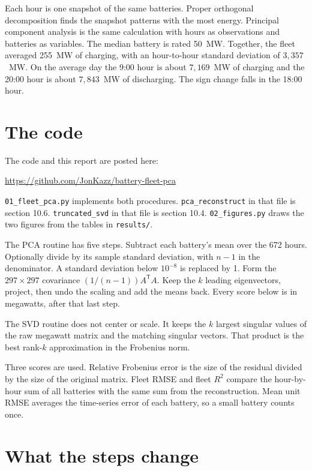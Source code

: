 \documentclass[12pt]{article}
\begin{document}
Each hour is one snapshot of the same batteries.
Proper orthogonal decomposition finds the snapshot patterns with the most energy.
Principal component analysis is the same calculation with hours as observations and batteries as variables.
The median battery is rated 50~MW.
Together, the fleet averaged 255~MW of charging, with an hour-to-hour standard deviation of $3{,}357$~MW.
On the average day the 9:00 hour is about $7{,}169$~MW of charging and the 20:00 hour is about $7{,}843$~MW of discharging.
The sign change falls in the 18:00 hour.

\section{The code}

The code and this report are posted here:

\url{https://github.com/JonKazz/battery-fleet-pca}

\texttt{01\_fleet\_pca.py} implements both procedures.
\texttt{pca\_reconstruct} in that file is section 10.6.
\texttt{truncated\_svd} in that file is section 10.4.
\texttt{02\_figures.py} draws the two figures from the tables in \texttt{results/}.

The PCA routine has five steps.
Subtract each battery's mean over the 672 hours.
Optionally divide by its sample standard deviation, with $n-1$ in the denominator.
A standard deviation below $10^{-8}$ is replaced by 1.
Form the $297 \times 297$ covariance $(1/(n-1)) A^{\mathsf T} A$.
Keep the $k$ leading eigenvectors, project, then undo the scaling and add the means back.
Every score below is in megawatts, after that last step.

The SVD routine does not center or scale.
It keeps the $k$ largest singular values of the raw megawatt matrix and the matching singular vectors.
That product is the best rank-$k$ approximation in the Frobenius norm.

Three scores are used.
Relative Frobenius error is the size of the residual divided by the size of the original matrix.
Fleet RMSE and fleet $R^{2}$ compare the hour-by-hour sum of all batteries with the same sum from the reconstruction.
Mean unit RMSE averages the time-series error of each battery, so a small battery counts once.

\section{What the steps change}
\end{document}
